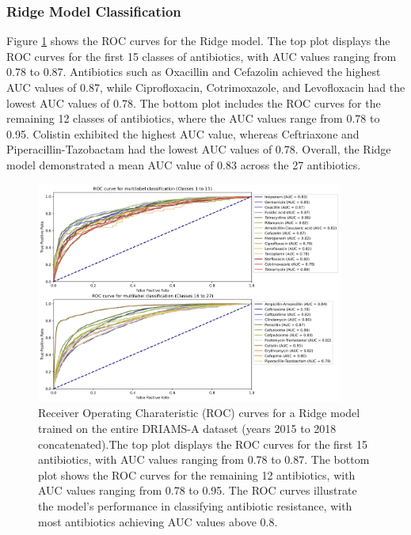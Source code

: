\documentclass[english,11pt,a4paper,titlepage]{article}
\begin{document}
\subsubsection*{Ridge Model Classification}
Figure \ref{fig:ROC_ridge} shows the ROC curves for the Ridge model. The top plot displays the ROC curves for the first 15 classes of antibiotics, with AUC values ranging from 0.78 to 0.87. Antibiotics such as Oxacillin and Cefazolin achieved the highest AUC values of 0.87, while Ciprofloxacin, Cotrimoxazole, and Levofloxacin had the lowest AUC values of 0.78. The bottom plot includes the ROC curves for the remaining 12 classes of antibiotics, where the AUC values range from 0.78 to 0.95. Colistin exhibited the highest AUC value, whereas Ceftriaxone and Piperacillin-Tazobactam had the lowest AUC values of 0.78. Overall, the Ridge model demonstrated a mean AUC value of 0.83 across the 27 antibiotics.

\begin{figure}[h]
	\centering
	\includegraphics[width=0.9\textwidth]{img/ROC_curves_ridge.png}
	\caption{Receiver Operating Charateristic (ROC) curves for a Ridge model trained on the entire DRIAMS-A dataset (years 2015 to 2018 concatenated).The top plot displays the ROC curves for the first 15 antibiotics, with AUC values ranging from 0.78 to 0.87. The bottom plot shows the ROC curves for the remaining 12 antibiotics, with AUC values ranging from 0.78 to 0.95. The ROC curves illustrate the model's performance in classifying antibiotic resistance, with most antibiotics achieving AUC values above 0.8.}
	\label{fig:ROC_ridge}
\end{figure}
\end{document}
